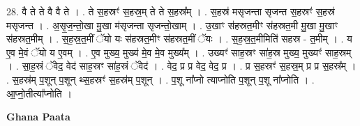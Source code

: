 \documentclass[17pt]{extarticle}
\begin{document}
28. वै ते ते वै वै ते । . ते स॒हस्रꣳ॑ स॒हस्र॒म् ते ते स॒हस्र᳚म् । . स॒हस्र॑ मसृजन्ता सृजन्त स॒हस्रꣳ॑ स॒हस्र॑ मसृजन्त । . अ॒सृ॒ज॒न्तो॒खा मु॒खा म॑सृजन्ता सृजन्तो॒खाम् । . उ॒खाꣳ स॑हस्रत॒मीꣳ स॑हस्रत॒मी मु॒खा मु॒खाꣳ स॑हस्रत॒मीम् । . स॒ह॒स्र॒त॒मीं ॅयो यः स॑हस्रत॒मीꣳ स॑हस्रत॒मीं ॅयः । . स॒ह॒स्र॒त॒मीमिति॑ सहस्र - त॒मीम् । . य ए॒व मे॒वं ॅयो य ए॒वम् । . ए॒व मुख्य॒ मुख्य॑ मे॒व मे॒व मुख्य᳚म् । . उख्यꣳ॑ साह॒स्रꣳ सा॑ह॒स्र मुख्य॒ मुख्यꣳ॑ साह॒स्रम् । . सा॒ह॒स्रं ॅवेद॒ वेद॑ साह॒स्रꣳ सा॑ह॒स्रं ॅवेद॑ । . वेद॒ प्र प्र वेद॒ वेद॒ प्र । . प्र स॒हस्रꣳ॑ स॒हस्र॒म् प्र प्र स॒हस्र᳚म् । . स॒हस्र॑म् प॒शून् प॒शून् थ्स॒हस्रꣳ॑ स॒हस्र॑म् प॒शून् । . प॒शू ना᳚प्नो त्याप्नोति प॒शून् प॒शू ना᳚प्नोति । . आ॒प्नो॒तीत्या᳚प्नोति । \newline

\textbf{Ghana Paata } \newline
\end{document}
